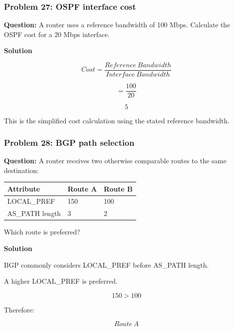 \subsubsection*{Problem 27: OSPF interface cost}

\textbf{Question:} A router uses a reference bandwidth of 100 Mbps. Calculate the OSPF cost for a 20 Mbps interface.

\textbf{Solution}



\[
Cost=\frac{Reference\ Bandwidth}{Interface\ Bandwidth}
\]





\[
=\frac{100}{20}
\]





\[
\boxed{5}
\]



This is the simplified cost calculation using the stated reference bandwidth.

\subsubsection*{Problem 28: BGP path selection}

\textbf{Question:} A router receives two otherwise comparable routes to the same destination:

\begin{center}
\begin{tabularx}{\linewidth}{p{3.5cm} p{4.5cm} X}
\toprule
\textbf{Attribute} & \textbf{Route A} & \textbf{Route B} \\
\midrule
LOCAL\_PREF & 150 & 100 \\
AS\_PATH length & 3 & 2 \\
\bottomrule
\end{tabularx}
\end{center}

Which route is preferred?

\textbf{Solution}

BGP commonly considers LOCAL\_PREF before AS\_PATH length.

A higher LOCAL\_PREF is preferred.



\[
150>100
\]



Therefore:



\[
\boxed{Route\ A}
\]



